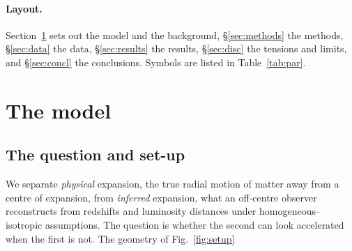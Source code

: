 \documentclass[11pt]{article}
\begin{document}
\paragraph{Layout.} Section~\ref{sec:model} sets out the model and the background, \S\ref{sec:methods} the methods, \S\ref{sec:data} the data, \S\ref{sec:results} the results, \S\ref{sec:disc} the tensions and limits, and \S\ref{sec:concl} the conclusions. Symbols are listed in Table~\ref{tab:par}.

\section{The model}\label{sec:model}
\subsection{The question and set-up}\label{sec:setup}
We separate \emph{physical} expansion, the true radial motion of matter away from a centre of expansion, from \emph{inferred} expansion, what an off-centre observer reconstructs from redshifts and luminosity distances under homogeneous--isotropic assumptions. The question is whether the second can look accelerated when the first is not. The geometry of Fig.~\ref{fig:setup}
\end{document}

